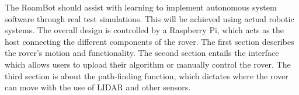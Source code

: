
The RoamBot should assist with learning to implement autonomous system software through real test simulations. This will be achieved using actual robotic systems. The overall design is controlled by a Raspberry Pi, which acts as the host connecting the different components of the rover. The first section describes the rover's motion and functionality. The second section entails the interface which allows users to upload their algorithm or manually control the rover. The third section is about the path-finding function, which dictates where the rover can move with the use of LIDAR and other sensors.
